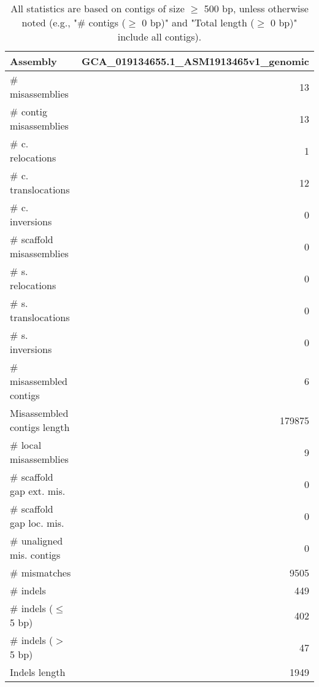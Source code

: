 \documentclass[12pt,a4paper]{article}
\begin{document}
\begin{table}[ht]
\begin{center}
\caption{All statistics are based on contigs of size $\geq$ 500 bp, unless otherwise noted (e.g., "\# contigs ($\geq$ 0 bp)" and "Total length ($\geq$ 0 bp)" include all contigs).}
\begin{tabular}{|l*{1}{|r}|}
\hline
Assembly & GCA\_019134655.1\_ASM1913465v1\_genomic \\ \hline
\# misassemblies & 13 \\ \hline
\hspace{2mm}\# contig misassemblies & 13 \\ \hline
\hspace{5mm}\# c. relocations & 1 \\ \hline
\hspace{5mm}\# c. translocations & 12 \\ \hline
\hspace{5mm}\# c. inversions & 0 \\ \hline
\hspace{2mm}\# scaffold misassemblies & 0 \\ \hline
\hspace{5mm}\# s. relocations & 0 \\ \hline
\hspace{5mm}\# s. translocations & 0 \\ \hline
\hspace{5mm}\# s. inversions & 0 \\ \hline
\# misassembled contigs & 6 \\ \hline
Misassembled contigs length & 179875 \\ \hline
\# local misassemblies & 9 \\ \hline
\# scaffold gap ext. mis. & 0 \\ \hline
\# scaffold gap loc. mis. & 0 \\ \hline
\# unaligned mis. contigs & 0 \\ \hline
\# mismatches & 9505 \\ \hline
\# indels & 449 \\ \hline
\hspace{5mm}\# indels ($\leq$ 5 bp) & 402 \\ \hline
\hspace{5mm}\# indels ($>$ 5 bp) & 47 \\ \hline
Indels length & 1949 \\ \hline
\end{tabular}
\end{center}
\end{table}
\end{document}
